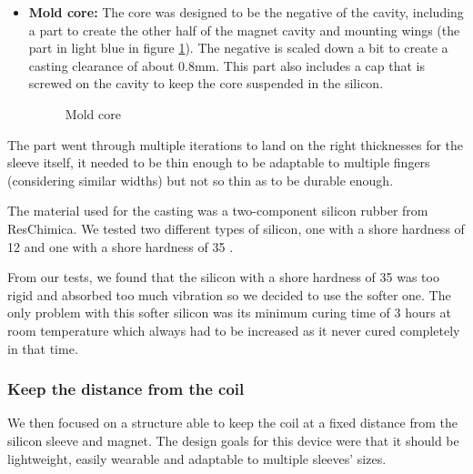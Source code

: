 \begin{itemize}
    \item \textbf{Mold core: } The core was designed to be the negative of the cavity, including a part to create the other half of the magnet cavity and mounting wings (the part in light blue in figure \ref{fig: mold_core}).
    The negative is scaled down a bit to create a casting clearance of about 0.8mm.
    This part also includes a cap that is screwed on the cavity to keep the core suspended in the silicon.
    \begin{figure}
        \centering
        \caption{Mold core}
        \label{fig: mold_core}
    \end{figure}
\end{itemize}

The part went through multiple iterations to land on the right thicknesses for the sleeve itself, it needed to be thin enough to be adaptable to multiple fingers (considering similar widths) but not so thin as to be durable enough.

The material used for the casting was a two-component silicon rubber from ResChimica.
We tested two different types of silicon, one with a shore hardness of 12 \cite{R_Pro_10_silicon} and one with a shore hardness of 35 \cite{R_Pro_Fast_silicon}.

From our tests, we found that the silicon with a shore hardness of 35 was too rigid and absorbed too much vibration so we decided to use the softer one.
The only problem with this softer silicon was its minimum curing time of 3 hours at room temperature which always had to be increased as it never cured completely in that time.

\subsubsection{Keep the distance from the coil}
We then focused on a structure able to keep the coil at a fixed distance from the silicon sleeve and magnet.
The design goals for this device were that it should be lightweight, easily wearable and adaptable to multiple sleeves' sizes.

